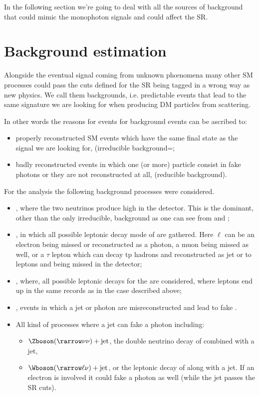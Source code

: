 In the following section we're going to deal with all the sources of background that could mimic the monophoton signals and could affect the SR.

\section{Background estimation}
Alongside the eventual signal coming from unknown ph\oe nomena many other SM processes could pass the cuts defined for the SR being tagged in a wrong way as new physics. We call them backgrounds, i.e. predictable events that lead to the same signature we are looking for when producing DM particles from \pp scattering.

In other words the reasons for events for background events can be ascribed to:
\begin{itemize}
\item properly reconstructed SM events which have the same final state as the signal we are looking for, (irreducible background=;
\item badly reconstructed events in which one (or more) particle consist in fake photons or they are not reconstructed at all, (reducible background).
\end{itemize}

For the \mph analysis the following background processes were considered.
\begin{itemize}
\item \znng\!, where the two neutrinos produce high \met in the detector. This is the dominant, other than the only irreducible, background as one can see from \Fig{\ref{subfig:SRp}} and \Fig{\ref{subfig:SRm}};
\item \wg\!, in which all possible leptonic decay mode of \Wboson are gathered. Here $\ell$ can be an electron being missed or reconstructed as a photon, a muon being missed as well, or a $\tau$ lepton which can decay tp hadrons and reconstructed as jet or to leptons and being missed in the detector;
\item \zg\!, where, all possible leptonic decays for the \Zboson are considered, where leptons end up in the same records as in the \Wboson case described above;
\item \gj\!, events in which a jet or photon are misreconstructed and lead to fake \met.
\item All kind of processes where a jet can fake a photon including:
  \begin{itemize}
  \item $\Zboson(\rarrow \nu\nu) + \text{jet}$, the double neutrino decay of \Zboson combined with a jet,
  \item $\Wboson(\rarrow \ell\nu) + \text{jet}$, or the leptonic decay of \Wboson along with a jet. If an electron is involved it could fake a photon as well (while the jet passes the SR cuts).
  \end{itemize}
\end{itemize}

